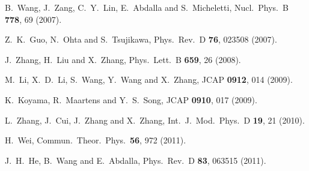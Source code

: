 \documentclass[aps,prd,nofootinbib,amsmath,amssymb,twocolumn,superscriptaddress,10pt]{revtex4}%
\begin{document}
\begin{thebibliography}{}
  B.~Wang, J.~Zang, C.~Y.~Lin, E.~Abdalla and S.~Micheletti,
  Nucl.\ Phys.\ B {\bf 778}, 69 (2007).



  Z.~K.~Guo, N.~Ohta and S.~Tsujikawa,
  Phys.\ Rev.\ D {\bf 76}, 023508 (2007).


  J.~Zhang, H.~Liu and X.~Zhang,
  Phys.\ Lett.\ B {\bf 659}, 26 (2008).

  M.~Li, X.~D.~Li, S.~Wang, Y.~Wang and X.~Zhang,
  JCAP {\bf 0912}, 014 (2009).

  K.~Koyama, R.~Maartens and Y.~S.~Song,
  JCAP {\bf 0910}, 017 (2009).

  L.~Zhang, J.~Cui, J.~Zhang and X.~Zhang,
  Int.\ J.\ Mod.\ Phys.\ D {\bf 19}, 21 (2010).




  H.~Wei,
  Commun.\ Theor.\ Phys.\  {\bf 56}, 972 (2011).

  J.~H.~He, B.~Wang and E.~Abdalla,
  Phys.\ Rev.\ D {\bf 83}, 063515 (2011).


\end{thebibliography}
\end{document}
